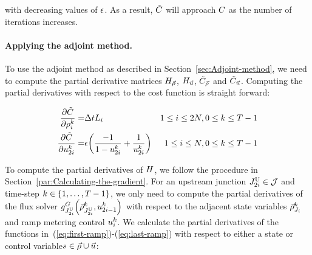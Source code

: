 							
							with decreasing values of $\epsilon$. As a result, $\tilde{C}$
							will approach $C$ as the number of iterations increases.
							
							
							\paragraph{Applying the adjoint method.}
							
							To use the adjoint method as described in Section~\ref{sec:Adjoint-method},
							we need to compute the partial derivative matrices $H_{\vec{\rho}}$, $H_{\vec{u}}$,
							$\tilde{C}_{\vec{\rho}}$ and $\tilde{C}_{\vec{u}}$. Computing the partial
							derivatives with respect to the cost function is straight forward:
							
							\begin{eqnarray*}
								\pfrac{\tilde{\cost}}{\discrete{\link}{\tind}}= & \Delta tL_{i} & 1\le i\le2\nlinks,0\le k\le T-1\\
								\pfrac{\tilde{\cost}}{\ramp_{2\link}^{\tind}}= & \barrierTerm\left(\frac{-1}{1-\ramp_{2\link}^{\tind}}+\frac{1}{\ramp_{2\link}^{\tind}}\right) & 1\le i\le\nlinks,0\le k\le T-1
							\end{eqnarray*}
							
							
							To compute the partial derivatives of $H$, we follow the procedure
							in Section~\ref{par:Calculating-the-gradient}. For an upstream junction
							$J_{2i}^{\text{U}}\in\mathcal{J}$ and time-step $k\in\intrange 1{\ntime-1}$,
							we only need to compute the partial derivatives of the flux solver
							$\god_{\jup{2\link}}\left(\juncstate{\jup{2\link}}{\tind},\ramp_{2\link-1}^{\tind}\right)_{\text{}}$
							with respect to the adjacent state variables $\vec{\rho}_{J_{i}}^{k}$
							and ramp metering control $u_{i}^{k}$. We calculate the
							partial derivatives of the functions in~(\eqref{eq:first-ramp})-(\eqref{eq:last-ramp})
							with respect to either a state or control variable$s\in\vec{\rho}\cup\vec{u}$:
							
